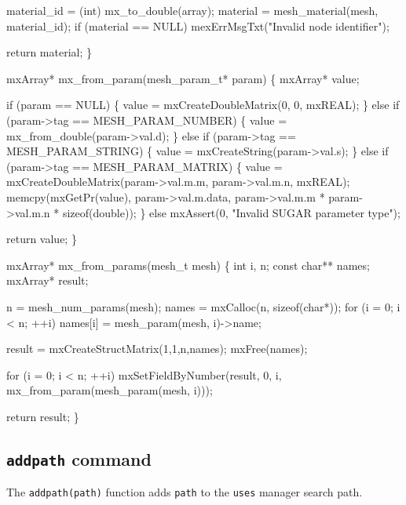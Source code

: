     material_id = (int) mx_to_double(array);
    material = mesh_material(mesh, material_id);
    if (material == NULL)
        mexErrMsgTxt("Invalid node identifier");

    return material;
\}

\nwendcode{}\nwdocspar

\nwenddocs{}\plusendmoddef
mxArray* mx_from_param(mesh_param_t* param)
\{
    mxArray* value;

    if (param == NULL) \{
        value = mxCreateDoubleMatrix(0, 0, mxREAL);
    \} else if (param->tag == MESH_PARAM_NUMBER) \{
        value = mx_from_double(param->val.d);
    \} else if (param->tag == MESH_PARAM_STRING) \{
        value = mxCreateString(param->val.s);
    \} else if (param->tag == MESH_PARAM_MATRIX) \{
        value = mxCreateDoubleMatrix(param->val.m.m, param->val.m.n, mxREAL);
        memcpy(mxGetPr(value), param->val.m.data,
               param->val.m.m * param->val.m.n * sizeof(double));
    \} else
        mxAssert(0, "Invalid SUGAR parameter type");
    
    return value;
\}

\nwendcode{}\nwdocspar

\nwenddocs{}\plusendmoddef
mxArray* mx_from_params(mesh_t mesh)
\{
    int i, n;
    const char** names;
    mxArray* result;

    n     = mesh_num_params(mesh);
    names = mxCalloc(n, sizeof(char*));
    for (i = 0; i < n; ++i)
        names[i] = mesh_param(mesh, i)->name;

    result = mxCreateStructMatrix(1,1,n,names);
    mxFree(names);

    for (i = 0; i < n; ++i)
        mxSetFieldByNumber(result, 0, i, mx_from_param(mesh_param(mesh, i)));

    return result;
\}

\nwendcode{}\nwdocspar


\subsection{{\tt{}addpath} command}

The {\tt{}addpath(path)} function adds {\tt{}path} to the 
{\tt{}uses} manager search path.

